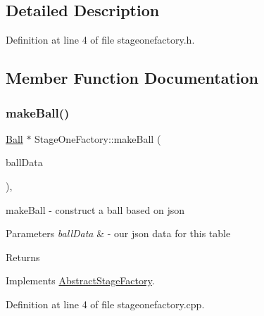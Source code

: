 \subsection{Detailed Description}


Definition at line 4 of file stageonefactory.\+h.



\subsection{Member Function Documentation}
\mbox{\label{class_stage_one_factory_a8a89031bc805b70d93e942275777394d}} 
\subsubsection{\texorpdfstring{make\+Ball()}{makeBall()}}
{\footnotesize\ttfamily \mbox{\hyperlink{class_ball}{Ball}} $\ast$ Stage\+One\+Factory\+::make\+Ball (\begin{DoxyParamCaption}\item[{const Q\+Json\+Object \&}]{ball\+Data }\end{DoxyParamCaption})\hspace{0.3cm}{\ttfamily [override]}, {\ttfamily [virtual]}}



make\+Ball -\/ construct a ball based on json 


\begin{DoxyParams}{Parameters}
{\em ball\+Data} & -\/ our json data for this table \\
\hline
\end{DoxyParams}
\begin{DoxyReturn}{Returns}

\end{DoxyReturn}


Implements \mbox{\hyperlink{class_abstract_stage_factory_a23367d64366e679aaff865620f5ce1ab}{Abstract\+Stage\+Factory}}.



Definition at line 4 of file stageonefactory.\+cpp.

\mbox{\label{class_stage_one_factory_ab9d7b7d74b61a2fd6c96562a67dc2fe8}} 
